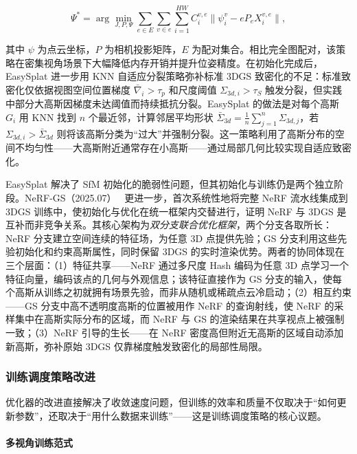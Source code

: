 \begin{equation}
\Psi^* = \arg\min_{J, P, \Psi} \sum_{e \in E}\sum_{v \in e}\sum_{i=1}^{HW} C_i^{v,e}\|\psi_i^v - e P_e X_i^{v,e}\|,
\end{equation}

其中 $\psi$ 为点云坐标，$P$ 为相机投影矩阵，$E$ 为配对集合。相比完全图配对，该策略在密集视角场景下大幅降低内存开销并提升位姿精度。在初始化完成后，EasySplat 进一步用 KNN 自适应分裂策略弥补标准 3DGS 致密化的不足：标准致密化仅依据视图空间位置梯度 $\bar{\nabla}_i > \tau_p$ 和尺度阈值 $\Sigma_{3d,i} > \tau_S$ 触发分裂，但实践中部分大高斯因梯度未达阈值而持续抵抗分裂。EasySplat 的做法是对每个高斯 $G_i$ 用 KNN 找到 $n$ 个最近邻，计算邻居平均形状 $\bar{\Sigma}_{3d} = \frac{1}{n}\sum_{j=1}^{n}\Sigma_{3d,j}$，若 $\Sigma_{3d,i} > \bar{\Sigma}_{3d}$ 则将该高斯分类为``过大''并强制分裂。这一策略利用了高斯分布的空间不均匀性——大高斯附近通常存在小高斯——通过局部几何比较实现自适应致密化。

EasySplat 解决了 SfM 初始化的脆弱性问题，但其初始化与训练仍是两个独立阶段。NeRF-GS（2025.07）~\cite{2507_23374} 更进一步，首次系统性地将完整 NeRF 流水线集成到 3DGS 训练中，使初始化与优化在统一框架内交替进行，证明 NeRF 与 3DGS 是互补而非竞争关系。其核心架构为\emph{双分支联合优化框架}，两个分支各取所长：NeRF 分支建立空间连续的特征场，为任意 3D 点提供先验；GS 分支利用这些先验初始化和约束高斯属性，同时保留 3DGS 的实时渲染优势。两者的协同体现在三个层面：（1）特征共享——NeRF 通过多尺度 Hash 编码为任意 3D 点学习一个特征向量，编码该点的几何与外观信息；该特征直接作为 GS 分支的输入，使每个高斯从训练之初就拥有场景先验，而非从随机或稀疏点云冷启动；（2）相互约束——GS 分支中高不透明度高斯的位置被用作 NeRF 的查询射线，使 NeRF 的采样集中在高斯实际分布的区域，而 NeRF 与 GS 的渲染结果在共享视点上被强制一致；（3）NeRF 引导的生长——在 NeRF 密度高但附近无高斯的区域自动添加新高斯，弥补原始 3DGS 仅靠梯度触发致密化的局部性局限。

\subsubsection{训练调度策略改进}

优化器的改进直接解决了收敛速度问题，但训练的效率和质量不仅取决于``如何更新参数''，还取决于``用什么数据来训练''——这是训练调度策略的核心议题。

\paragraph{多视角训练范式}

